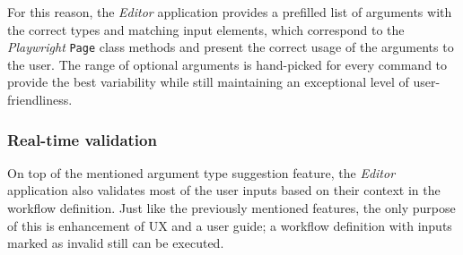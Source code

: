 For this reason, the \textit{Editor} application provides a prefilled list of arguments with the correct types and matching input elements,
which correspond to the \textit{Playwright} \texttt{Page} class methods and present the correct usage of the arguments to the user.
The range of optional arguments is hand-picked for every command to provide the best variability while still maintaining an exceptional level of user-friendliness.

\subsubsection{Real-time validation}
On top of the mentioned argument type suggestion feature, the \textit{Editor} application also validates most of the user inputs based on their context in the workflow definition.
Just like the previously mentioned features, the only purpose of this is enhancement of \acs{UX} and a user guide; a workflow definition with inputs marked as invalid still can be executed.